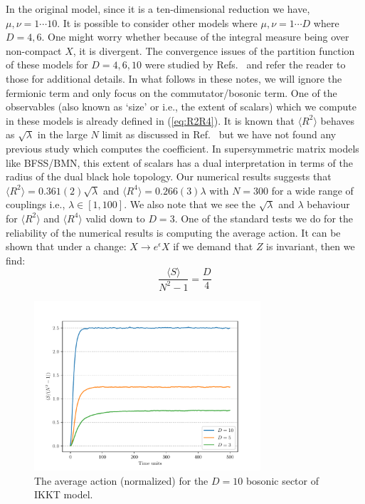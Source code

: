 \documentclass[11pt]{article}
\begin{document}
In the original model, since it is a ten-dimensional reduction we have, $\mu, \nu = 1 \cdots 10$. 
It is possible to consider other models where $\mu, \nu = 1 \cdots D$ where $D=4,6$. 
One might worry whether because of the integral measure being over non-compact $X$, 
it is divergent. The convergence issues of the partition function of 
these models for $D=4,6,10$ were studied by Refs.~\cite{Krauth:1998yu,Krauth:1999qw} and 
refer the reader to those for additional details.  
In what follows in these notes, we will ignore the fermionic 
term and only focus on the commutator/bosonic term. 
One of the observables (also known as `size' or i.e., the extent of scalars) 
which we compute in these models is already defined in (\ref{eq:R2R4}). 
It is known that $\langle R^2 \rangle$ behaves as $\sqrt{\lambda}$ in the large $N$ limit 
as discussed in Ref.~\cite{Hotta:1998en} but we have not found any previous study
which computes the coefficient. In supersymmetric matrix models like BFSS/BMN, this 
extent of scalars has a dual interpretation in terms of the radius of 
the dual black hole topology.  Our numerical results suggests 
that $ \langle R^2 \rangle = 0.361(2) \sqrt{\lambda}$ 
and $ \langle R^4 \rangle = 0.266(3) \lambda$ with $N = 300$ for a wide range of couplings i.e., 
$\lambda \in [1,100]$. We also note that we see the $\sqrt{\lambda}$ and $\lambda$ behaviour for 
$\langle R^2 \rangle$ and $\langle R^4 \rangle$ valid down to $D=3$. 
One of the standard tests we do for the reliability of the numerical results is 
computing the average action. It can be shown that under a 
change: $X \to e^{\epsilon} X$ if we demand that $Z$ is invariant, 
then we find:
\begin{equation}
\label{eq:SD_IKKT1} 
	\frac{\langle S \rangle}{N^2 - 1} = \frac{D}{4} 
\end{equation}
\begin{figure}[htbp] 
	\centering 
	\includegraphics[width=0.75\textwidth]{figs/act_allD_YM.pdf}
	\caption{\label{fig:IKKT_2}The average action (normalized) for the $D=10$ bosonic sector of IKKT model.}
\end{figure}
\end{document}
